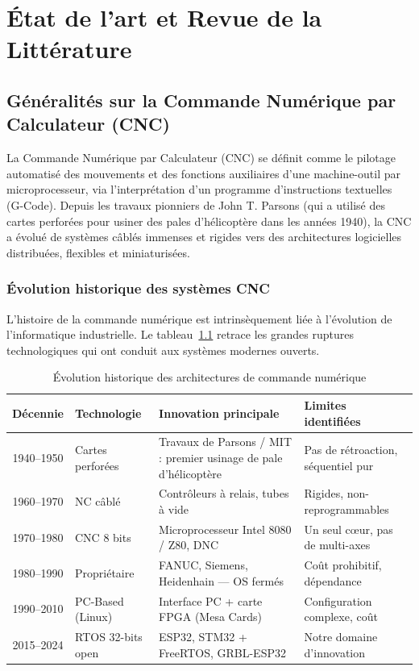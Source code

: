 \chapter{État de l'art et Revue de la Littérature}
\label{chap:etat_art}

\section{Généralités sur la Commande Numérique par Calculateur (CNC)}
La Commande Numérique par Calculateur (CNC) se définit comme le pilotage automatisé des mouvements et des fonctions auxiliaires d'une machine-outil par microprocesseur, via l'interprétation d'un programme d'instructions textuelles (G-Code). Depuis les travaux pionniers de John T. Parsons (qui a utilisé des cartes perforées pour usiner des pales d'hélicoptère dans les années 1940), la CNC a évolué de systèmes câblés immenses et rigides vers des architectures logicielles distribuées, flexibles et miniaturisées.

\subsection{Évolution historique des systèmes CNC}
L'histoire de la commande numérique est intrinsèquement liée à l'évolution de l'informatique industrielle. Le tableau~\ref{tab:histoire_cnc} retrace les grandes ruptures technologiques qui ont conduit aux systèmes modernes ouverts.

\begin{table}[htbp]
\centering
\renewcommand{\arraystretch}{1.3}
\begin{tabular}{|c|p{2.5cm}|p{6cm}|p{4.5cm}|}
\hline
\rowcolor{macouleur!20}
\textbf{Décennie} & \textbf{Technologie} & \textbf{Innovation principale} & \textbf{Limites identifiées} \\
\hline
1940--1950 & Cartes perforées & Travaux de Parsons / MIT : premier usinage de pale d'hélicoptère & Pas de rétroaction, séquentiel pur \\
\hline
1960--1970 & NC câblé & Contrôleurs à relais, tubes à vide & Rigides, non-reprogrammables \\
\hline
1970--1980 & CNC 8 bits & Microprocesseur Intel 8080 / Z80, DNC & Un seul cœur, pas de multi-axes \\
\hline
1980--1990 & Propriétaire & FANUC, Siemens, Heidenhain — OS fermés & Coût prohibitif, dépendance \\
\hline
1990--2010 & PC-Based (Linux) & Interface PC + carte FPGA (Mesa Cards) & Configuration complexe, coût \\
\hline
2015--2024 & RTOS 32-bits open & ESP32, STM32 + FreeRTOS, GRBL-ESP32 & Notre domaine d'innovation \\
\hline
\end{tabular}
\caption{Évolution historique des architectures de commande numérique}
\label{tab:histoire_cnc}
\end{table}

